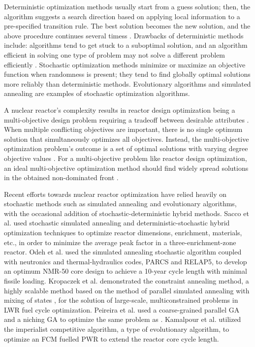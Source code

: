 Deterministic optimization methods usually start from a guess solution;
then, the algorithm suggests a search direction based on applying local 
information to a pre-specified transition rule. 
The best solution becomes the new solution, and the above procedure continues 
several timess \cite{deb_multi-objective_2001}. 
Drawbacks of deterministic methods include: algorithms tend to get stuck to a 
suboptimal solution, and an algorithm efficient in solving one type of problem 
may not solve a different problem efficiently \cite{deb_multi-objective_2001}. 
Stochastic optimization methods minimize or maximize an objective function 
when randomness is present; they tend to find globally optimal solutions 
more reliably than deterministic methods. 
Evolutionary algorithms and simulated annealing are examples of stochastic 
optimization algorithms. 

A nuclear reactor's complexity results in reactor design optimization being a 
multi-objective design problem requiring a tradeoff between desirable 
attributes \cite{byrne_evolving_2014,simon_sciences_2019}. 
When multiple conflicting objectives are important, there is no single optimum 
solution that simultaneously optimizes all objectives. 
Instead, the multi-objective optimization problem's outcome is a set of optimal 
solutions with varying degree objective values \cite{deb_multi-objective_2001}. 
For a multi-objective problem like reactor design optimization, 
an ideal multi-objective optimization method should find widely spread solutions 
in the obtained non-dominated front \cite{deb_multi-objective_2001}. 

Recent efforts towards nuclear reactor optimization have relied heavily on 
stochastic methods such as simulated annealing and evolutionary algorithms, 
with the occasional addition of stochastic-deterministic hybrid methods. 
Sacco et al. \cite{sacco_two_2006,sacco_metropolis_2008} used stochastic 
simulated annealing and deterministic-stochastic hybrid optimization techniques 
to optimize reactor dimensions, enrichment, materials, etc., in order to 
minimize the average peak factor in a three-enrichment-zone reactor. 
Odeh et al. \cite{odeh_core_2016} used the simulated annealing stochastic algorithm 
coupled with neutronics and thermal-hydraulics codes, \gls{PARCS} and RELAP5, 
to develop an optimum \gls{NMR-50} core design to achieve a 10-year cycle length 
with minimal fissile loading. 
Kropaczek et al. \cite{kropaczek_large-scale_2019} demonstrated the constraint 
annealing method, a highly scalable method based on the method of parallel 
simulated annealing with mixing of states \cite{kropaczek_constraint_2019}, for 
the solution of large-scale, multiconstrained problems in \gls{LWR} fuel cycle 
optimization. 
Peireira et al. \cite{pereira_coarse-grained_2003,pereira_parallel_2008} 
used a coarse-grained parallel \gls{GA} and a niching \gls{GA}
to optimize the same problem as \cite{sacco_two_2006}. 
Kamalpour et al. \cite{kamalpour_smart_2020} utilized the imperialist competitive 
algorithm, a type of evolutionary algorithm, to optimize an \gls{FCM} fuelled 
\gls{PWR} to extend the reactor core cycle length. 

